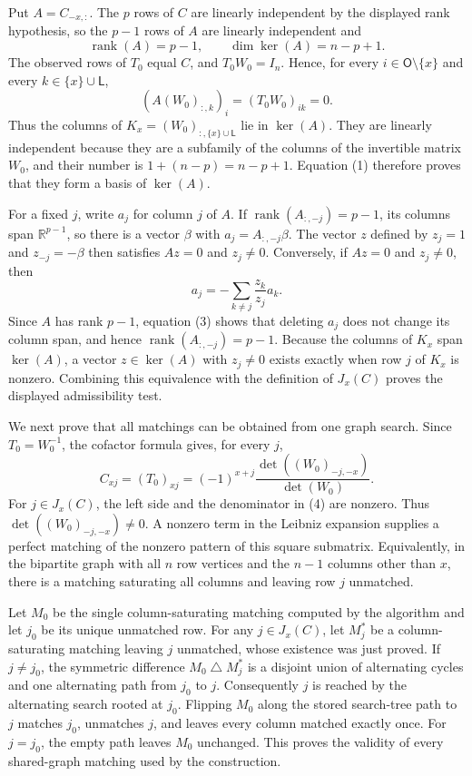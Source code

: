 Put \(A=C_{-x,:}\). The \(p\) rows of \(C\) are linearly independent by the displayed rank hypothesis, so the \(p-1\) rows of \(A\) are linearly independent and
\[
 \operatorname{rank}(A)=p-1,
 \qquad
 \dim\ker(A)=n-p+1. \tag{1}
\]
The observed rows of \(T_0\) equal \(C\), and \(T_0W_0=I_n\). Hence, for every \(i\in\mathsf O\setminus\{x\}\) and every \(k\in\{x\}\cup\mathsf L\),
\[
 (A(W_0)_{:,k})_i=(T_0W_0)_{ik}=0. \tag{2}
\]
Thus the columns of \(K_x=(W_0)_{:,\{x\}\cup\mathsf L}\) lie in \(\ker(A)\). They are linearly independent because they are a subfamily of the columns of the invertible matrix \(W_0\), and their number is \(1+(n-p)=n-p+1\). Equation (1) therefore proves that they form a basis of \(\ker(A)\).

For a fixed \(j\), write \(a_j\) for column \(j\) of \(A\). If \(\operatorname{rank}(A_{:,-j})=p-1\), its columns span \(\mathbb R^{p-1}\), so there is a vector \(\beta\) with \(a_j=A_{:,-j}\beta\). The vector \(z\) defined by \(z_j=1\) and \(z_{-j}=-\beta\) then satisfies \(Az=0\) and \(z_j\ne0\). Conversely, if \(Az=0\) and \(z_j\ne0\), then
\[
 a_j=-\sum_{k\ne j}\frac{z_k}{z_j}a_k. \tag{3}
\]
Since \(A\) has rank \(p-1\), equation (3) shows that deleting \(a_j\) does not change its column span, and hence \(\operatorname{rank}(A_{:,-j})=p-1\). Because the columns of \(K_x\) span \(\ker(A)\), a vector \(z\in\ker(A)\) with \(z_j\ne0\) exists exactly when row \(j\) of \(K_x\) is nonzero. Combining this equivalence with the definition of \(J_x(C)\) proves the displayed admissibility test.

We next prove that all matchings can be obtained from one graph search. Since \(T_0=W_0^{-1}\), the cofactor formula gives, for every \(j\),
\[
 C_{xj}=(T_0)_{xj}
 =(-1)^{x+j}\frac{\det((W_0)_{-j,-x})}{\det(W_0)}. \tag{4}
\]
For \(j\in J_x(C)\), the left side and the denominator in (4) are nonzero. Thus \(\det((W_0)_{-j,-x})\ne0\). A nonzero term in the Leibniz expansion supplies a perfect matching of the nonzero pattern of this square submatrix. Equivalently, in the bipartite graph with all \(n\) row vertices and the \(n-1\) columns other than \(x\), there is a matching saturating all columns and leaving row \(j\) unmatched.

Let \(M_0\) be the single column-saturating matching computed by the algorithm and let \(j_0\) be its unique unmatched row. For any \(j\in J_x(C)\), let \(M_j^*\) be a column-saturating matching leaving \(j\) unmatched, whose existence was just proved. If \(j\ne j_0\), the symmetric difference \(M_0\mathbin\triangle M_j^*\) is a disjoint union of alternating cycles and one alternating path from \(j_0\) to \(j\). Consequently \(j\) is reached by the alternating search rooted at \(j_0\). Flipping \(M_0\) along the stored search-tree path to \(j\) matches \(j_0\), unmatches \(j\), and leaves every column matched exactly once. For \(j=j_0\), the empty path leaves \(M_0\) unchanged. This proves the validity of every shared-graph matching used by the construction.

